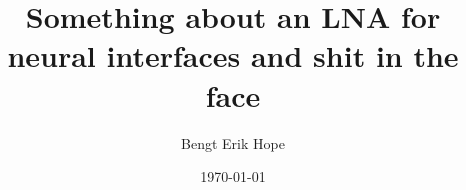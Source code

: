 \newcommand{\mytitle}{Something about an LNA for neural interfaces and shit in the face}
\newcommand{\myauthor}{Bengt Erik Hope}

\title{\mytitle}
\author{\myauthor}
\date{\today}
